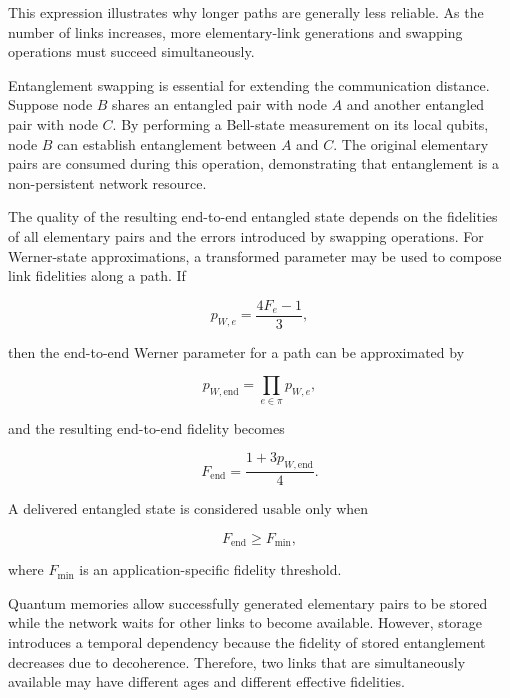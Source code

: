 This expression illustrates why longer paths are generally less reliable. As the number of links increases, more elementary-link generations and swapping operations must succeed simultaneously.

Entanglement swapping is essential for extending the communication distance. Suppose node $B$ shares an entangled pair with node $A$ and another entangled pair with node $C$. By performing a Bell-state measurement on its local qubits, node $B$ can establish entanglement between $A$ and $C$. The original elementary pairs are consumed during this operation, demonstrating that entanglement is a non-persistent network resource.

The quality of the resulting end-to-end entangled state depends on the fidelities of all elementary pairs and the errors introduced by swapping operations. For Werner-state approximations, a transformed parameter may be used to compose link fidelities along a path. If

\begin{equation}
    p_{W,e}
    =
    \frac{4F_e-1}{3},
\end{equation}

then the end-to-end Werner parameter for a path can be approximated by

\begin{equation}
    p_{W,\mathrm{end}}
    =
    \prod_{e \in \pi}
    p_{W,e},
\end{equation}

and the resulting end-to-end fidelity becomes

\begin{equation}
    F_{\mathrm{end}}
    =
    \frac{1+3p_{W,\mathrm{end}}}{4}.
\end{equation}

A delivered entangled state is considered usable only when

\begin{equation}
    F_{\mathrm{end}}
    \geq
    F_{\min},
\end{equation}

where $F_{\min}$ is an application-specific fidelity threshold.

Quantum memories allow successfully generated elementary pairs to be stored while the network waits for other links to become available. However, storage introduces a temporal dependency because the fidelity of stored entanglement decreases due to decoherence. Therefore, two links that are simultaneously available may have different ages and different effective fidelities.

